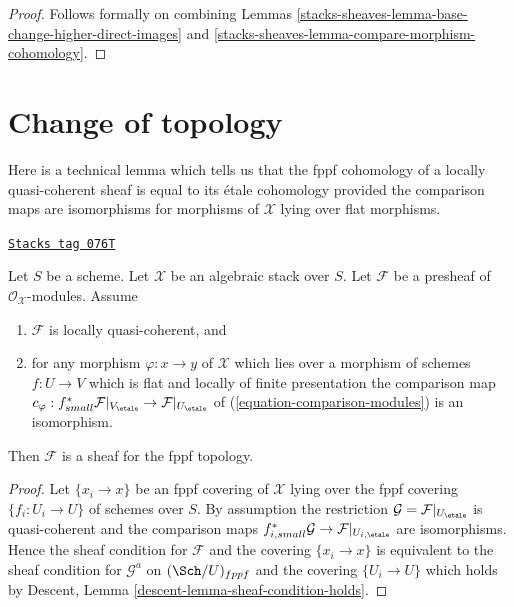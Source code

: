\begin{proof}
Follows formally on combining
Lemmas \ref{stacks-sheaves-lemma-base-change-higher-direct-images} and
\ref{stacks-sheaves-lemma-compare-morphism-cohomology}.
\end{proof}

\section{Change of topology}
\label{stacks-sheaves-section-change-topology}
Here is a technical lemma which tells us that the
fppf cohomology of a locally quasi-coherent sheaf is equal to its
\'etale cohomology provided the comparison maps are isomorphisms
for morphisms of $\mathcal{X}$ lying over flat morphisms.

\begin{lemma}
\label{stacks-sheaves-lemma-lqc-flat-base-change-fppf-sheaf}
\href{https://stacks.math.columbia.edu/tag/076T}{\texttt{Stacks tag 076T}}

Let $S$ be a scheme. Let $\mathcal{X}$ be an algebraic stack over $S$.
Let $\mathcal{F}$ be a presheaf of $\mathcal{O}_\mathcal{X}$-modules.
Assume
\begin{enumerate}
\item[(a)] $\mathcal{F}$ is locally quasi-coherent, and
\item[(b)] for any morphism $\varphi : x \to y$ of $\mathcal{X}$ which lies
over a morphism of schemes $f : U \to V$ which is flat and
locally of finite presentation the comparison map
$c_\varphi : f_{small}^*\mathcal{F}|_{V_\etale} \to
\mathcal{F}|_{U_\etale}$ of
(\ref{equation-comparison-modules}) is an isomorphism.
\end{enumerate}
Then $\mathcal{F}$ is a sheaf for the fppf topology.
\end{lemma}

\begin{proof}
Let $\{x_i \to x\}$ be an fppf covering of $\mathcal{X}$ lying over the
fppf covering $\{f_i : U_i \to U\}$ of schemes over $S$.
By assumption the restriction $\mathcal{G} = \mathcal{F}|_{U_\etale}$
is quasi-coherent and the comparison maps
$f_{i, small}^*\mathcal{G} \to \mathcal{F}|_{U_{i, \etale}}$
are isomorphisms. Hence the sheaf condition for $\mathcal{F}$
and the covering $\{x_i \to x\}$ is equivalent to the sheaf condition
for $\mathcal{G}^a$ on $(\Sch/U)_{fppf}$ and the covering $\{U_i \to U\}$
which holds by
Descent, Lemma \ref{descent-lemma-sheaf-condition-holds}.
\end{proof}

